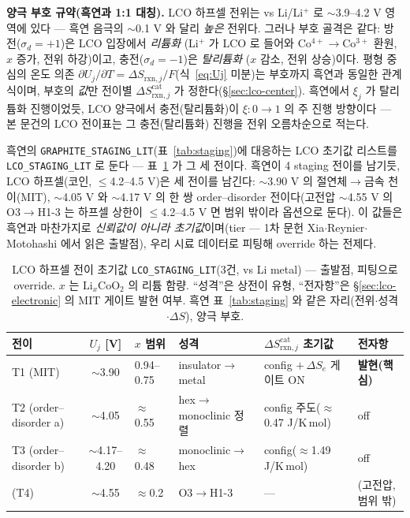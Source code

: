 \documentclass[11pt,a4paper]{article}
\newcommand{\rxn}{\mathrm{rxn}}
\newcommand{\code}[1]{\texttt{#1}}
\begin{document}
\textbf{양극 부호 규약(흑연과 1:1 대칭).} LCO 하프셀 전위는 vs Li/Li$^+$ 로 $\sim$3.9--4.2 V 영역에 있다 — 흑연 음극의
$\sim$0.1 V 와 달리 \emph{높은} 전위다. 그러나 부호 골격은 같다: 방전($\sigma_d=+1$)은 LCO 입장에서 \emph{리튬화}
(Li$^+$ 가 LCO 로 들어와 Co$^{4+}\!\to$Co$^{3+}$ 환원, $x$ 증가, 전위 하강)이고, 충전($\sigma_d=-1$)은 \emph{탈리튬화}
($x$ 감소, 전위 상승)이다. 평형 중심의 온도 의존 $\partial U_j/\partial T=\Delta S_{\rxn,j}/F$(식~\eqref{eq:Uj} 미분)는
부호까지 흑연과 동일한 관계식이며, 부호의 \emph{값}만 전이별 $\Delta S_{\rxn,j}^\mathrm{cat}$ 가 정한다(\S\ref{sec:lco-center}).
흑연에서 $\xi_j$ 가 탈리튬화 진행이었듯, LCO 양극에서 충전(탈리튬화)이 $\xi:0\!\to\!1$ 의 주 진행 방향이다 — 본 문건의
LCO 전이표는 그 충전(탈리튬화) 진행을 전위 오름차순으로 적는다.

흑연의 \code{GRAPHITE\_STAGING\_LIT}(표~\ref{tab:staging})에 대응하는 LCO 초기값 리스트를
\code{LCO\_STAGING\_LIT} 로 둔다 — 표~\ref{tab:lco-staging} 가 그 세 전이다. 흑연이 4 staging 전이를 남기듯, LCO
하프셀(코인, $\le$4.2--4.5 V)은 세 전이를 남긴다\cite{xia2007}: $\sim$3.90 V 의 절연체$\to$금속 천이(MIT), $\sim$4.05 V 와
$\sim$4.17 V 의 한 쌍 order--disorder 전이다(고전압 $\sim$4.55 V 의 O3$\to$H1-3 는 하프셀 상한이 $\le$4.2--4.5 V 면
범위 밖이라 옵션으로 둔다). 이 값들은 흑연과 마찬가지로 \emph{신뢰값이 아니라 초기값}이며(tier — 1차 문헌
Xia\cite{xia2007}$\cdot$Reynier\cite{reynier2004}$\cdot$Motohashi\cite{motohashi2009} 에서 읽은 출발점), 우리 시료 데이터로
피팅해 override 하는 전제다.

\begin{table}[t]
\centering\footnotesize
\renewcommand{\arraystretch}{1.3}
\caption{LCO 하프셀 전이 초기값 \code{LCO\_STAGING\_LIT}(3건, vs Li metal) — 출발점, 피팅으로 override. $x$ 는
$\mathrm{Li}_x\mathrm{CoO_2}$ 의 리튬 함량. ``성격''은 상전이 유형, ``전자항''은 \S\ref{sec:lco-electronic} 의 MIT
게이트 발현 여부. 흑연 표~\ref{tab:staging} 와 같은 자리(전위$\cdot$성격$\cdot\Delta S$), 양극 부호.}
\label{tab:lco-staging}
\begin{tabular}{@{}p{} c p{} p{} p{} p{}@{}}
\toprule
전이 & $U_j$ [V] & $x$ 범위 & 성격 & $\Delta S_{\rxn,j}^\mathrm{cat}$ 초기값 & 전자항 \\
\midrule
T1 (MIT)              & $\sim$3.90        & 0.94--0.75 & insulator$\to$metal       & config $+\,\Delta S_e$ 게이트 ON & \textbf{발현(핵심)} \\
T2 (order--disorder a)& $\sim$4.05        & $\approx$0.55 & hex$\to$monoclinic 정렬 & config 주도($\approx$0.47 J/K\,mol) & off \\
T3 (order--disorder b)& $\sim$4.17--4.20  & $\approx$0.48 & monoclinic$\to$hex      & config($\approx$1.49 J/K\,mol) & off \\
\midrule
(T4)                  & $\sim$4.55        & $\approx$0.2 & O3$\to$H1-3              & --- & (고전압, 범위 밖) \\
\bottomrule
\end{tabular}
\end{table}
\end{document}

